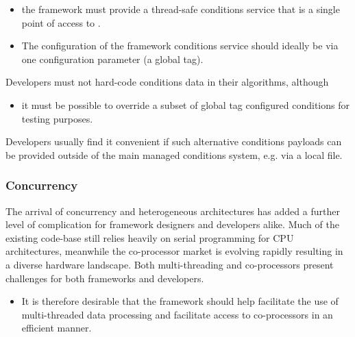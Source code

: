 \documentclass[../main-v1.tex]{subfiles}
\begin{document}
\begin{itemize}
\item the framework must provide a thread-safe conditions service that is a single point of access to .  

\item The configuration of the framework conditions service should ideally be via one configuration parameter (a global tag). 
\end{itemize}

Developers must not hard-code conditions data in their algorithms, although 

\begin{itemize}
\item it must be possible to override a subset of global tag configured conditions for testing purposes.  
\end{itemize}

Developers usually find it convenient if such alternative conditions payloads can be provided outside of the main managed conditions system, e.g. via a local file.

\subsubsection{Concurrency} %

The arrival of concurrency and heterogeneous architectures has added a further level of complication for framework designers and developers alike.  Much of the existing code-base still relies heavily on serial programming for CPU architectures, meanwhile the co-processor market is evolving rapidly resulting in a diverse hardware landscape.  Both multi-threading and co-processors present challenges for both frameworks and developers.  
\begin{itemize}
\item It is therefore desirable that the framework should help facilitate the use of multi-threaded data processing and facilitate access to co-processors in an efficient manner. 
\end{itemize}
\end{document}
